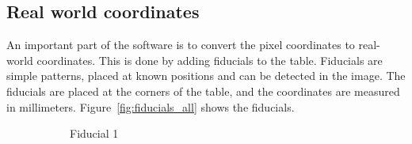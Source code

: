 \subsection{Real world coordinates}\label{subsec:real-world-coordinates}
An important part of the software is to convert the pixel coordinates to real-world coordinates.
This is done by adding fiducials to the table.
Fiducials are simple patterns, placed at known positions and can be detected in the image.
The fiducials are placed at the corners of the table, and the coordinates are measured in millimeters.
Figure~\ref{fig:fiducials_all} shows the fiducials.
\begin{figure}[H]
    \centering
    \begin{subfigure}{.2\textwidth}
        \centering
        \caption[originalRainbow]{Fiducial 1}
        \label{fig:fid_1}
    \end{subfigure}%
    \begin{subfigure}{.2\textwidth}
        \centering

\end{subfigure}
\end{figure}

